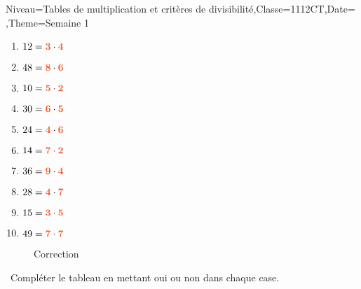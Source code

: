 \documentclass[a4paper,11pt,fleqn]{article}
\begin{document}
\begin{Maquette}[Fiche, CorrigeApres=false, CorrigeFin=true]{Niveau=Tables de multiplication et critères de divisibilité,Classe=1112CT,Date=   ,Theme=Semaine 1}
\begin{Solution}
\begin{enumerate}[itemsep=1em]
	\item $12={\color[HTML]{f15929}\boldsymbol{3}} \cdot {\color[HTML]{f15929}\boldsymbol{4}}$
	\item $48={\color[HTML]{f15929}\boldsymbol{8}} \cdot {\color[HTML]{f15929}\boldsymbol{6}}$
	\item $10={\color[HTML]{f15929}\boldsymbol{5}} \cdot {\color[HTML]{f15929}\boldsymbol{2}}$
	\item $30={\color[HTML]{f15929}\boldsymbol{6}} \cdot {\color[HTML]{f15929}\boldsymbol{5}}$
	\item $24={\color[HTML]{f15929}\boldsymbol{4}} \cdot {\color[HTML]{f15929}\boldsymbol{6}}$
	\item $14={\color[HTML]{f15929}\boldsymbol{7}} \cdot {\color[HTML]{f15929}\boldsymbol{2}}$
	\item $36={\color[HTML]{f15929}\boldsymbol{9}} \cdot {\color[HTML]{f15929}\boldsymbol{4}}$
	\item $28={\color[HTML]{f15929}\boldsymbol{4}} \cdot {\color[HTML]{f15929}\boldsymbol{7}}$
	\item $15={\color[HTML]{f15929}\boldsymbol{3}} \cdot {\color[HTML]{f15929}\boldsymbol{5}}$
	\item $49={\color[HTML]{f15929}\boldsymbol{7}} \cdot {\color[HTML]{f15929}\boldsymbol{7}}$
\end{enumerate}
\end{Solution}

\begin{exercice}
\begin{wrapfigure}{r}{2cm}
\centering
{\hypersetup{urlcolor=black}
}

Correction
\end{wrapfigure}\ 
Compléter le tableau en mettant oui ou non dans chaque case.
 


\end{exercice}
\end{Maquette}
\end{document}
